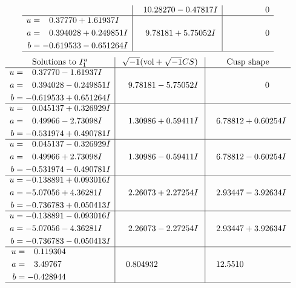 \documentclass[1p]{elsarticle_modified}
\theoremstyle{definition}
\newcommand{\I}{\sqrt{-1}}
\begin{document}
$$\begin{array}{c|c|c}
 & \phantom{-}10.28270 - 0.47817 I & \phantom{-0.000000 } 0 \\ \hline\begin{aligned}
u &= \phantom{-}0.37770 + 1.61937 I \\
a &= \phantom{-}0.394028 + 0.249851 I \\
b &= -0.619533 - 0.651264 I\end{aligned}
 & \phantom{-}9.78181 + 5.75052 I & \phantom{-0.000000 } 0\\
 \hline 
 \end{array}$$\newpage$$\begin{array}{c|c|c}  
\text{Solutions to }I^u_{1}& \I (\text{vol} + \sqrt{-1}CS) & \text{Cusp shape}\\
 \hline 
\begin{aligned}
u &= \phantom{-}0.37770 - 1.61937 I \\
a &= \phantom{-}0.394028 - 0.249851 I \\
b &= -0.619533 + 0.651264 I\end{aligned}
 & \phantom{-}9.78181 - 5.75052 I & \phantom{-0.000000 } 0 \\ \hline\begin{aligned}
u &= \phantom{-}0.045137 + 0.326929 I \\
a &= \phantom{-}0.49966 - 2.73098 I \\
b &= -0.531974 + 0.490781 I\end{aligned}
 & \phantom{-}1.30986 + 0.59411 I & \phantom{-}6.78812 + 0.60254 I \\ \hline\begin{aligned}
u &= \phantom{-}0.045137 - 0.326929 I \\
a &= \phantom{-}0.49966 + 2.73098 I \\
b &= -0.531974 - 0.490781 I\end{aligned}
 & \phantom{-}1.30986 - 0.59411 I & \phantom{-}6.78812 - 0.60254 I \\ \hline\begin{aligned}
u &= -0.138891 + 0.093016 I \\
a &= -5.07056 + 4.36281 I \\
b &= -0.736783 + 0.050413 I\end{aligned}
 & \phantom{-}2.26073 + 2.27254 I & \phantom{-}2.93447 - 3.92634 I \\ \hline\begin{aligned}
u &= -0.138891 - 0.093016 I \\
a &= -5.07056 - 4.36281 I \\
b &= -0.736783 - 0.050413 I\end{aligned}
 & \phantom{-}2.26073 - 2.27254 I & \phantom{-}2.93447 + 3.92634 I \\ \hline\begin{aligned}
u &= \phantom{-}0.119304\phantom{ +0.000000I} \\
a &= \phantom{-}3.49767\phantom{ +0.000000I} \\
b &= -0.428944\phantom{ +0.000000I}\end{aligned}
 & \phantom{-}0.804932\phantom{ +0.000000I} & \phantom{-}12.5510\phantom{ +0.000000I}\\
 \hline 
 \end{array}$$\newpage\newpage\renewcommand{\arraystretch}{1}
\end{document}
